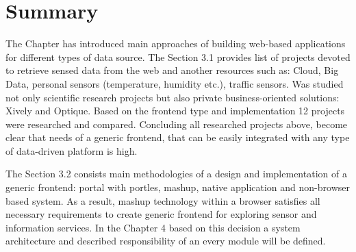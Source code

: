 \section{Summary}
The Chapter has introduced main approaches of building web-based applications for different types of data source. The Section 3.1 provides list of projects devoted to retrieve sensed data from the web and another resources such as: Cloud, Big Data, personal sensors (temperature, humidity etc.), traffic sensors. Was studied not only scientific research projects but also private business-oriented solutions: Xively and Optique. Based on the frontend type and implementation 12 projects were researched and compared. Concluding all researched projects above, become clear that needs of a generic frontend, that can be easily integrated with any type of data-driven platform is high.

The Section 3.2 consists main methodologies of a design and implementation of a generic frontend: portal with portles, mashup, native application and non-browser based system. As a result, mashup technology within a browser satisfies all necessary requirements to create generic frontend for exploring sensor and information services. In the Chapter 4 based on this decision a system architecture and described responsibility of an every module will be defined. 